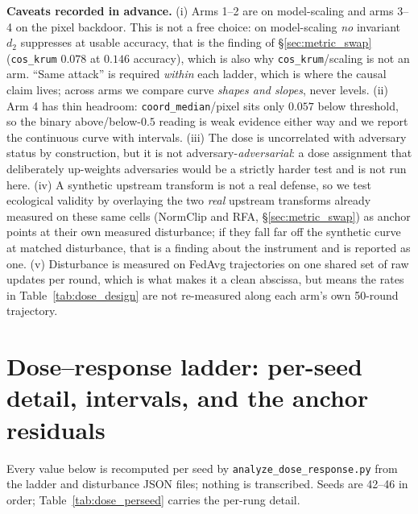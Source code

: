 \documentclass{article}
\begin{document}
\textbf{Caveats recorded in advance.} (i) Arms 1--2 are on model-scaling and arms 3--4 on the pixel backdoor. This is not a free choice: on model-scaling \emph{no} invariant $d_2$ suppresses at usable accuracy, that is the finding of §\ref{sec:metric_swap} (\texttt{cos\_krum} $0.078$ at $0.146$ accuracy), which is also why \texttt{cos\_krum}/scaling is not an arm. ``Same attack'' is required \emph{within} each ladder, which is where the causal claim lives; across arms we compare curve \emph{shapes and slopes}, never levels. (ii) Arm 4 has thin headroom: \texttt{coord\_median}/pixel sits only $0.057$ below threshold, so the binary above/below-$0.5$ reading is weak evidence either way and we report the continuous curve with intervals. (iii) The dose is uncorrelated with adversary status by construction, but it is not adversary-\emph{adversarial}: a dose assignment that deliberately up-weights adversaries would be a strictly harder test and is not run here. (iv) A synthetic upstream transform is not a real defense, so we test ecological validity by overlaying the two \emph{real} upstream transforms already measured on these same cells (NormClip and RFA, §\ref{sec:metric_swap}) as anchor points at their own measured disturbance; if they fall far off the synthetic curve at matched disturbance, that is a finding about the instrument and is reported as one. (v) Disturbance is measured on FedAvg trajectories on one shared set of raw updates per round, which is what makes it a clean abscissa, but means the rates in Table~\ref{tab:dose_design} are not re-measured along each arm's own 50-round trajectory.

\section{Dose--response ladder: per-seed detail, intervals, and the anchor residuals}
\label{app:dose_detail}

Every value below is recomputed per seed by \texttt{analyze\_dose\_response.py} from the ladder and disturbance JSON files; nothing is transcribed. Seeds are 42--46 in order; Table~\ref{tab:dose_perseed} carries the per-rung detail.
\end{document}

